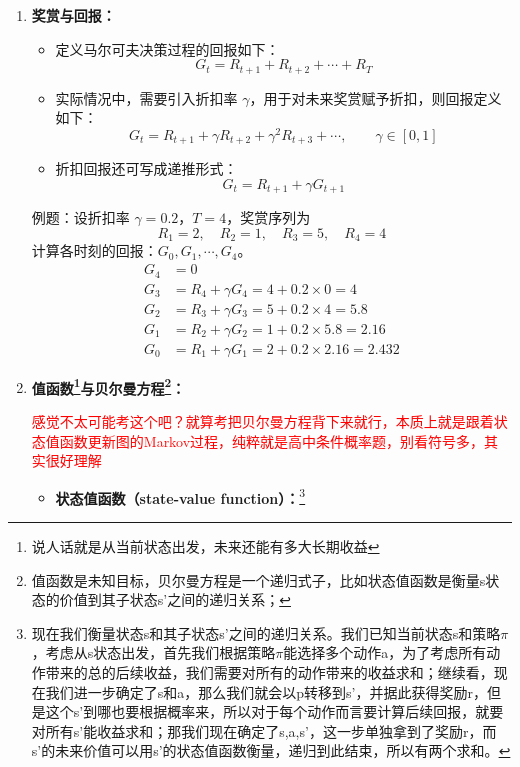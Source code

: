 \documentclass[../main.tex]{subfiles}
\begin{document}
\begin{enumerate}
    \item \textbf{奖赏与回报：}
    \begin{itemize}
        \item 定义马尔可夫决策过程的回报如下：
        $$
        G_t=R_{t+1}+R_{t+2}+\cdots+R_T
        $$
        \item 实际情况中，需要引入折扣率 $\gamma$，用于对未来奖赏赋予折扣，则回报定义如下：
        $$
        G_t=R_{t+1}+\gamma R_{t+2}+\gamma^2 R_{t+3}+\cdots,\qquad \gamma\in[0,1]
        $$
        \item 折扣回报还可写成递推形式：
        $$
        G_t=R_{t+1}+\gamma G_{t+1}
        $$
    \end{itemize}

    {\small\kaishu
    例题：设折扣率 $\gamma=0.2$，$T=4$，奖赏序列为
        $$
        R_1=2,\quad R_2=1,\quad R_3=5,\quad R_4=4
        $$
        计算各时刻的回报：$G_0,G_1,\cdots,G_4$。
        \begin{align*}
        G_4 &= 0 \\
        G_3 &= R_4+\gamma G_4 = 4+0.2\times 0 = 4 \\
        G_2 &= R_3+\gamma G_3 = 5+0.2\times 4 = 5.8 \\
        G_1 &= R_2+\gamma G_2 = 1+0.2\times 5.8 = 2.16 \\
        G_0 &= R_1+\gamma G_1 = 2+0.2\times 2.16 = 2.432
        \end{align*}
    }


    
    \item \textbf{值函数\footnote{说人话就是从当前状态出发，未来还能有多大长期收益}与贝尔曼方程\footnote{值函数是未知目标，贝尔曼方程是一个递归式子，比如状态值函数是衡量s状态的价值到其子状态s'之间的递归关系；}：}
    
    \textcolor{red}{感觉不太可能考这个吧？就算考把贝尔曼方程背下来就行，本质上就是跟着状态值函数更新图的Markov过程，纯粹就是高中条件概率题，别看符号多，其实很好理解}
    \begin{itemize}
        \item \textbf{状态值函数（state-value function）：}\footnote{现在我们衡量状态s和其子状态s'之间的递归关系。我们已知当前状态s和策略$\pi$，考虑从s状态出发，首先我们根据策略$\pi$能选择多个动作a，为了考虑所有动作带来的总的后续收益，我们需要对所有的动作带来的收益求和；继续看，现在我们进一步确定了s和a，那么我们就会以p转移到s'，并据此获得奖励r，但是这个s'到哪也要根据概率来，所以对于每个动作而言要计算后续回报，就要对所有s'能收益求和；那我们现在确定了s,a,s'，这一步单独拿到了奖励r，而s'的未来价值可以用s'的状态值函数衡量，递归到此结束，所以有两个求和。}
    

\end{itemize}
\end{enumerate}
\end{document}
